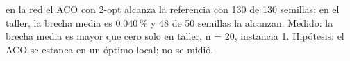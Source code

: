 {en la red el ACO con 2-opt alcanza la referencia con 130 de 130 semillas; en el taller, la brecha media es 0.040\,\% y 48 de 50 semillas la alcanzan.}
{Medido: la brecha media es mayor que cero solo en taller, n = 20, instancia 1. Hipótesis: el ACO se estanca en un óptimo local; no se midió.}
